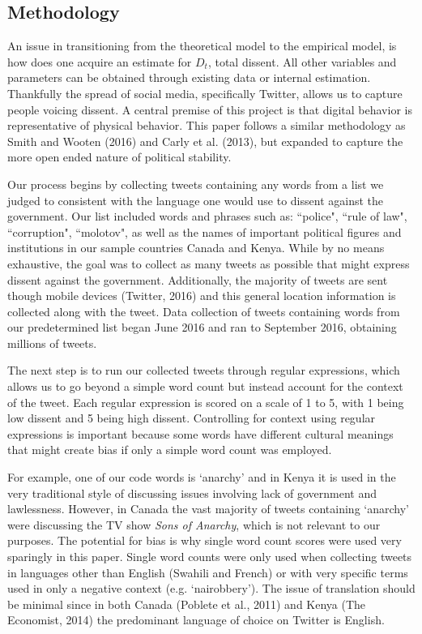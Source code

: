 \documentclass[12pt]{article}
\begin{document}
\begin{spacing}{1.5}
\section*{Methodology}

An issue in transitioning from the theoretical model to the empirical model, is how does one acquire an estimate for $D_t$, total dissent. All other variables and parameters can be obtained through existing data or internal estimation. Thankfully the spread of social media, specifically Twitter, allows us to capture people voicing dissent. A central premise of this project is that digital behavior is representative of physical behavior. This paper follows a similar methodology as Smith and Wooten (2016) and Carly et al. (2013), but expanded to capture the more open ended nature of political stability. 

Our process begins by collecting tweets containing any words from a list we judged to consistent with the language one would use to dissent against the government. Our list included words and phrases such as: ``police", ``rule of law", ``corruption", ``molotov", as well as the names of important political figures and institutions in our sample countries Canada and Kenya. While by no means exhaustive, the goal was to collect as many tweets as possible that might express dissent against the government. Additionally, the majority of tweets are sent though mobile devices (Twitter, 2016) and this general location information is collected along with the tweet. Data collection of tweets containing words from our predetermined list began June 2016 and ran to September 2016, obtaining millions of tweets.


The next step is to run our collected tweets through regular expressions, which allows us to go beyond a simple word count but instead account for the context of the tweet. Each regular expression is scored on a scale of 1 to 5, with 1 being low dissent and 5 being high dissent. Controlling for context using regular expressions is important because some words have different cultural meanings that might create bias if only a simple word count was employed. 

For example, one of our code words is `anarchy' and in Kenya it is used in the very traditional style of discussing issues involving lack of government and lawlessness. However, in Canada the vast majority of tweets containing `anarchy' were discussing the TV show \textit{Sons of Anarchy}, which is not relevant to our purposes. The potential for bias is why single word count scores were used very sparingly in this paper. Single word counts were only used when collecting tweets in languages other than English (Swahili and French) or with very specific terms used in only a negative context (e.g. `nairobbery'). The issue of translation should be minimal since in both Canada (Poblete et al., 2011) and Kenya (The Economist, 2014) the predominant language of choice on Twitter is English. 


\end{spacing}
\end{document}
